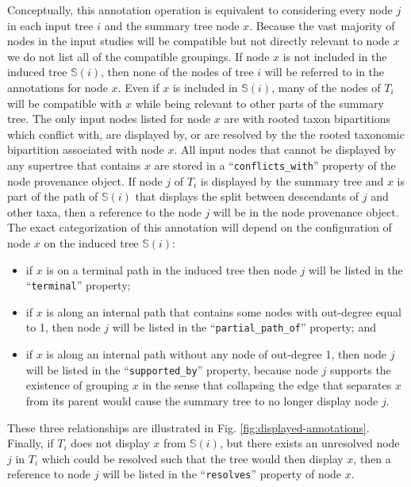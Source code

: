\documentclass[fleqn,12pt,lineno,english]{wlpeerj}
\newcommand{\supportedby}{\texttt{supported\_by}}
\newcommand{\partialpathof}{\texttt{partial\_path\_of}}
\newcommand{\terminal}{\texttt{terminal}}
\newcommand{\conflictswith}{\texttt{conflicts\_with}}
\newcommand{\resolves}{\texttt{resolves}}
\begin{document}
Conceptually, this annotation operation is equivalent to considering
every node $j$ in each input tree $i$ and the summary tree node
$x$. Because the vast majority of nodes in the input studies will
be compatible but not directly relevant to node $x$ we do not list
all of the compatible groupings. If node $x$ is not included in the
induced tree $\mathcal{\mathbb{S}}(i)$, then none of the nodes of
tree $i$ will be referred to in the annotations for node $x$. Even
if $x$ is included in $\mathcal{\mathbb{S}}(i)$, many of the nodes
of $T_{i}$ will be compatible with $x$ while being relevant to other
parts of the summary tree. The only input nodes listed for node $x$
are with rooted taxon bipartitions which conflict with, are displayed
by, or are resolved by the the rooted taxonomic bipartition associated
with node $x$. All input nodes that cannot be displayed by any supertree
that contains $x$ are stored in a ``\conflictswith{}'' property
of the node provenance object. If node $j$ of $T_{i}$ is displayed
by the summary tree and $x$ is part of the path of $\mathcal{\mathbb{S}}(i)$
that displays the split between descendants of $j$ and other taxa,
then a reference to the node $j$ will be in the node provenance object.
The exact categorization of this annotation will depend on the configuration
of node $x$ on the induced tree $\mathcal{\mathbb{S}}(i)$:
\begin{itemize}
\item if $x$ is on a terminal path in the induced tree then node $j$ will
be listed in the ``\terminal{}'' property;
\item if $x$ is along an internal path that contains some nodes with out-degree
equal to 1, then node $j$ will be listed in the ``\partialpathof{}''
property; and
\item if $x$ is along an internal path without any node of out-degree 1,
then node $j$ will be listed in the ``\supportedby{}'' property,
because node $j$ supports the existence of grouping $x$ in the sense
that collapsing the edge that separates $x$ from its parent would
cause the summary tree to no longer display node $j$.
\end{itemize}
These three relationships are illustrated in Fig. \ref{fig:displayed-annotations}.
Finally, if $T_{i}$ does not display $x$ from $\mathcal{\mathbb{S}}(i)$,
but there exists an unresolved node $j$ in $T_{i}$ which could be
resolved such that the tree would then display $x$, then a reference
to node $j$ will be listed in the ``\resolves{}'' property of node
$x$. 
\end{document}
